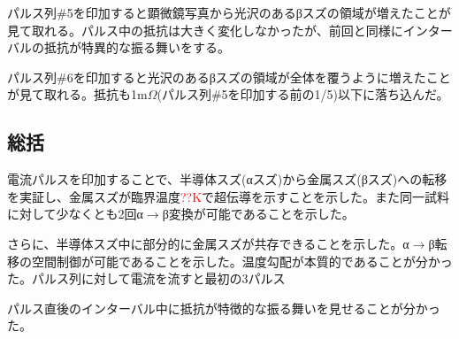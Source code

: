 パルス列\#5を印加すると顕微鏡写真から光沢のあるβスズの領域が増えたことが見て取れる。パルス中の抵抗は大きく変化しなかったが、前回と同様にインターバルの抵抗が特異的な振る舞いをする。

パルス列\#6を印加すると光沢のあるβスズの領域が全体を覆うように増えたことが見て取れる。抵抗も1m$\Omega$(パルス列\#5を印加する前の1/5)以下に落ち込んだ。

\subsection{総括}
電流パルスを印加することで、半導体スズ(αスズ)から金属スズ(βスズ)への転移を実証し、金属スズが臨界温度\textcolor{red}{??K}で超伝導を示すことを示した。また同一試料に対して少なくとも2回α$\to$β変換が可能であることを示した。

さらに、半導体スズ中に部分的に金属スズが共存できることを示した。α$\to$β転移の空間制御が可能であることを示した。温度勾配が本質的であることが分かった。パルス列に対して電流を流すと最初の3パルス

パルス直後のインターバル中に抵抗が特徴的な振る舞いを見せることが分かった。


\clearpage

